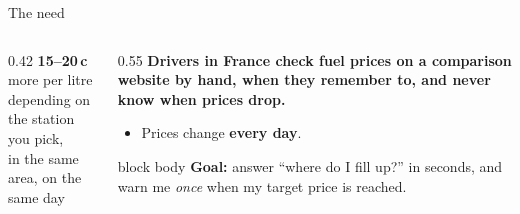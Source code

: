 \documentclass[aspectratio=169,11pt]{beamer}
\begin{document}
\begin{frame}{The need}
  \begin{columns}[c]
    \begin{column}{0.42\textwidth}
      \centering
      {\fontsize{54}{56}\selectfont\bfseries\color{rapidored} 15--20\,c}\\[2pt]
      {\large\color{ink} more per litre}\\[2pt]
      {\small\color{soft} depending on the station you pick,\\ in the same area, on the same day}
    \end{column}
    \begin{column}{0.55\textwidth}
      {\large\bfseries\color{ratzpurple}Drivers in France check fuel prices on a comparison website by hand, when they remember to, and never know when prices drop.}
      \vspace{8pt}
      \begin{itemize}\setlength{\itemsep}{4pt}
        \item Prices change \textbf{every day}.
      \end{itemize}
      \vspace{10pt}
      \begin{beamercolorbox}[rounded=true,sep=8pt]{block body}
        \small\textbf{Goal:} answer ``where do I fill up?'' in seconds, and warn me
        \emph{once} when my target price is reached.
      \end{beamercolorbox}
    \end{column}
  \end{columns}
\end{frame}
\end{document}
